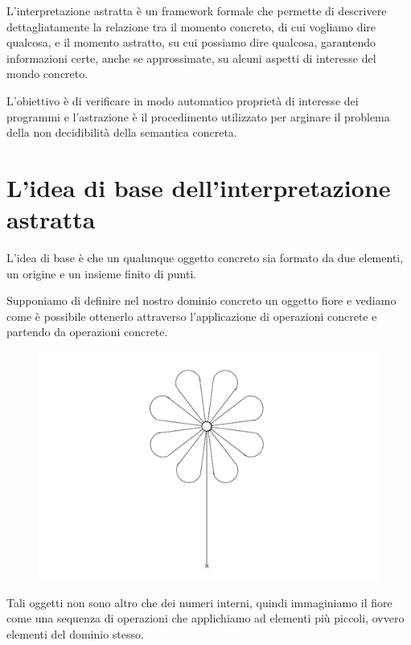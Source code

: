 \begin{tcolorbox}[title=Interpretazione astratta]
    L'interpretazione astratta è un framework formale che permette di descrivere 
    dettagliatamente la relazione tra il momento concreto, di cui vogliamo dire 
    qualcosa, e il momento astratto, su cui possiamo dire qualcosa, garantendo informazioni 
    certe, anche se approssimate, su alcuni aspetti di interesse
    del mondo concreto.
\end{tcolorbox}
L'obiettivo è di verificare in modo automatico proprietà di interesse dei programmi e 
l'astrazione è il procedimento utilizzato per arginare il problema della non decidibilità
della semantica concreta.

\section{L'idea di base dell'interpretazione astratta}
L'idea di base è che un qualunque oggetto concreto sia formato da due elementi, un origine e 
un insieme finito di punti.

Supponiamo di definire nel nostro dominio concreto un oggetto fiore e vediamo come è possibile 
ottenerlo attraverso l'applicazione di operazioni concrete e partendo da operazioni concrete.
\begin{figure}[H]
    \centering 
    \includegraphics[scale=0.5]{img/flower.png}
\end{figure}
Tali oggetti non sono altro che dei numeri interni, quindi immaginiamo il fiore come una sequenza 
di operazioni che applichiamo ad elementi più piccoli, ovvero elementi del dominio stesso.
